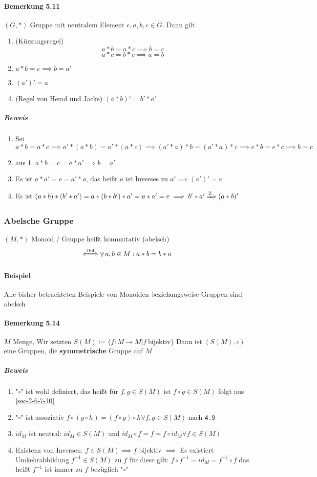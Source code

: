 \documentclass[a4paper]{scrartcl}
\DeclareMathOperator{\Forall}{\forall}
\theoremstyle{definition}
\theoremstyle{plain}
\theoremstyle{plain}
\theoremstyle{remark}
\theoremstyle{remark}
\theoremstyle{remark}
\theoremstyle{remark}
\theoremstyle{remark}
\begin{document}
\paragraph{Bemerkung 5.11}
\label{sec-3-1-4-2}
$(G,*)$ Gruppe mit neutralem Element $e,a,b,c \in G$. Dann gilt
\begin{enumerate}
\item (Kürzungsregel) \[a*b = a*c \implies b = c\] \[a*c = b * c \implies a = b\]
\item $a*b = e \implies b = a'$
\item $(a')' = a$
\item (Regel von Hemd und Jacke) $(a*b)' = b' * a'$
\end{enumerate}
\subparagraph{Beweis}
\label{sec-3-1-4-2-1}
\begin{enumerate}
\item Sei $a * b = a * c \implies a'*(a*b) = a'*(a*c) \implies (a'*a)*b=(a'*a)*c \implies e*b = e*c \implies b = c$
\item aus 1. $a*b = c = a*a' \implies b = a'$
\item Es ist $a*a' = e = a' * a$, das heißt $a$ ist Inverses zu $a' \implies (a')' = a$
\item Es ist $(a*b)*(b'*a') = a*(b*b')*a' = a*a' = e \implies b' * a' \xRightarrow{\text{2.}} (a *b)'$
\end{enumerate}
\subsubsection{Abelsche Gruppe}
\label{sec-3-1-5}
$(M,*)$ Monoid / Gruppe heißt kommutativ (abelsch)
\[\xLeftrightarrow{\text{Def}} \Forall a,b\in M: a*b = b*a\]
\paragraph{Beispiel}
\label{sec-3-1-5-1}
Alle bisher betrachteten Beispiele von Monoiden beziehungsweise Gruppen sind abelsch
\paragraph{Bemerkung 5.14}
\label{sec-3-1-5-2}
$M$ Menge, Wir setzten $S(M):= \{f:M\to M | f~\text{bijektiv}\}$
Dann ist $(S(M),\circ)$ eine Gruppen, die \textbf{symmetrische} Gruppe auf $M$
\subparagraph{Beweis}
\label{sec-3-1-5-2-1}
\begin{enumerate}
\item "$\circ$" ist wohl definiert, das heißt für $f,g\in S(M)$ ist $f\circ g \in S(M)$ folgt aus \ref{sec-2-6-7-10}
\item "$\circ$" ist assoziativ $f\circ(g\circ h) = (f\circ g) \circ h \Forall f,g\in S(M)$ nach \texttt{4.9}
\item $id_M$ ist neutral: $id_M \in S(M)$ und $id_M\circ f = f = f\circ id_M \Forall f\in S(M)$
\item Existenz von Inversen: $f\in S(M) \implies f$ bijektiv $\implies$ Es existiert Umkehrabbildung $f^{-1}\in S(M)$ zu $f$
         für diese gilt: $f\circ f^{-1} = id_M = f^{-1}\circ f$ das heißt $f^{-1}$ ist immer zu $f$ bezüglich "$\circ$"
\end{enumerate}
\end{document}
